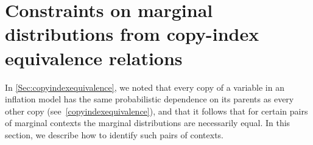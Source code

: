 {\section{Constraints on marginal distributions from copy-index equivalence relations}\label{sec:coincidingdetails}



In \cref{Sec:copyindexequivalence}, we noted that every copy of a variable in an inflation model has the same probabilistic dependence on its parents as every other copy (see~\cref{copyindexequivalence}), and that it follows that for certain pairs of marginal contexts the marginal distributions are necessarily equal.  In this section, we describe how to identify such pairs of contexts. 


}
